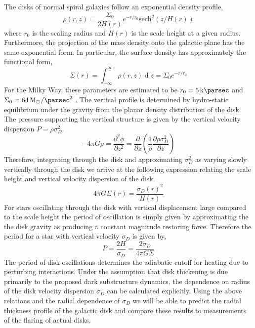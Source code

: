 \documentclass[usenatbib]{mnras}
\renewcommand{\d}[1]{\! \mathrm{d}#1 \:}
\newcommand{\pderiv}[2]{\frac{\partial{#1}}{\partial{#2}}}
\renewcommand{\d}[1]{\ensuremath{\operatorname{d}\!{#1}}}
\begin{document}
\par
The disks of normal spiral galaxies follow an exponential density profile,
\begin{equation}
\rho(r, z) = \frac{\Sigma_0}{2 H(r)} e^{-r/r_0} \mathrm{sech}^2{(z/H(r))} 
\end{equation}
where $r_0$ is the scaling radius and $H(r)$ is the scale height at a given radius. Furthermore, the projection of the mass density onto the galactic plane has the same exponential form. In particular, the surface density has approximately the functional form,
\begin{equation}
\Sigma(r) = \int_{-\infty}^{\infty} \rho(r, z) \d{z} = \Sigma_0 e^{-r / r_0}
\end{equation}
For the Milky Way, these parameters are estimated to be $r_0 = \SI{5}{\kilo \parsec}$ and $\Sigma_0 = \SI{64}{M_{\odot} \per \parsec \squared}$ \citep{dynamical_measurement}. The vertical profile is determined by hydro-static equilibrium under the gravity from the planar density distribution of the disk. The pressure supporting the vertical structure is given by the vertical velocity dispersion $P = \rho \sigma_D^2$. 
\begin{equation}
- 4 \pi G \rho = \frac{\partial^2 \phi}{\partial z^2} = \pderiv{}{z} \left( \frac{1}{\rho} \pderiv{ \rho \sigma_D^2}{z} \right)
\end{equation}  
Therefore, integrating through the disk and approximating $\sigma_D^2$ as varying slowly vertically through the disk we arrive at the following expression relating the scale height and vertical velocity dispersion of the disk.
\begin{equation} \label{scale}
4 \pi G \Sigma(r) = \frac{ \sigma_D(r)^2 }{H(r)}
\end{equation}
For stars oscillating through the disk with vertical displacement large compared to the scale height the period of oscillation is simply given by approximating the the disk gravity as producing a constant magnitude restoring force. Therefore the period for a star with vertical velocity $\sigma_D$ is given by,
\begin{equation}
P = \frac{2 H}{\sigma_D} = \frac{2 \sigma_D}{4 \pi G \Sigma}
\end{equation}
The period of disk oscillations determines the adiabatic cutoff for heating due to perturbing interactions. Under the assumption that disk thickening is due primarily to the proposed dark substructure dynamics, the dependence on radius of the disk velocity dispersion $\sigma_D$ can be calculated explicitly. Using the above relations and the radial dependence of $\sigma_D$ we will be able to predict the radial thickness profile of the galactic disk and compare these results to measurements of the flaring of actual disks.  
\end{document}
